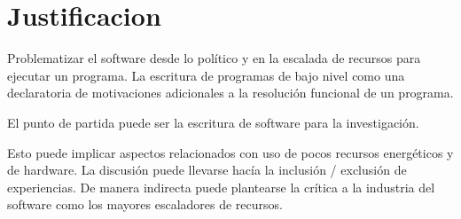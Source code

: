 \section*{Justificacion}

Problematizar el software desde lo político y en la escalada de recursos para ejecutar un programa. La escritura de programas de bajo nivel como una declaratoria de motivaciones adicionales a la resolución funcional de un programa. 

El punto de partida puede ser la escritura de software para la investigación. 

Esto puede implicar aspectos relacionados con uso de pocos recursos energéticos y de hardware. La discusión puede llevarse hacía la inclusión / exclusión de experiencias. De manera indirecta puede plantearse la crítica a la industria del software como los mayores escaladores de recursos.

